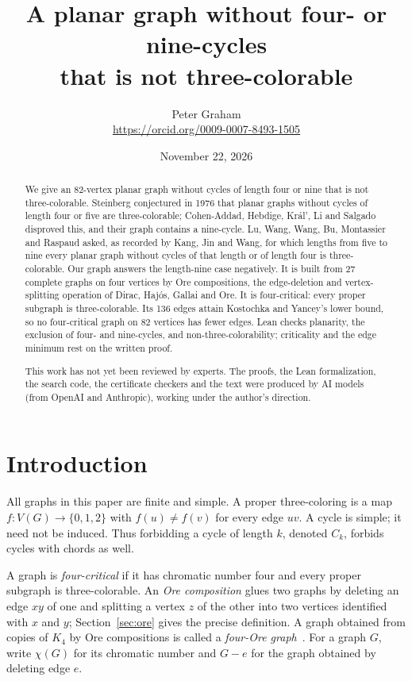 \documentclass[11pt]{article}
\title{A planar graph without four- or nine-cycles\texorpdfstring{\\}{ }that is not three-colorable}
\author{Peter Graham\\ \small\url{https://orcid.org/0009-0007-8493-1505}}
\date{November 22, 2026}
\begin{document}
\maketitle
\begin{abstract}
We give an 82-vertex planar graph without cycles of length four or nine
that is not three-colorable. Steinberg conjectured in 1976 that planar
graphs without cycles of length four or five are three-colorable;
Cohen-Addad, Hebdige, Kr\'al', Li and Salgado disproved this, and their
graph contains a nine-cycle. Lu, Wang, Wang, Bu, Montassier and Raspaud
asked, as recorded by Kang, Jin and Wang, for which lengths from five to
nine every planar graph without cycles of that length or of length four
is three-colorable. Our graph answers the length-nine case negatively.
It is built from 27 complete graphs on four vertices by Ore
compositions, the edge-deletion and vertex-splitting operation of Dirac,
Haj\'os, Gallai and Ore. It is four-critical: every proper subgraph is
three-colorable. Its 136 edges attain Kostochka and Yancey's lower bound,
so no four-critical graph on 82 vertices has fewer edges. Lean checks planarity, the exclusion of four- and
nine-cycles, and non-three-colorability; criticality and the edge
minimum rest on the written proof.

This work has not yet been reviewed by experts. The proofs, the Lean formalization, the search code, the certificate checkers and the text were produced by AI models (from OpenAI and Anthropic), working under the author's direction.
\end{abstract}
\medskip

\section{Introduction}
All graphs in this paper are finite and simple. A proper three-coloring
is a map $f:V(G)\to\{0,1,2\}$ with $f(u)\ne f(v)$ for every edge $uv$.
A cycle is simple; it need not be induced. Thus forbidding a cycle of
length $k$, denoted $C_k$, forbids cycles with chords as well.

A graph is \emph{four-critical} if it has chromatic number four and
every proper subgraph is three-colorable.
An \emph{Ore composition} glues two graphs by deleting an edge $xy$ of
one and splitting a vertex $z$ of the other into two vertices identified
with $x$ and $y$; Section~\ref{sec:ore} gives the precise definition. A
graph obtained from copies of $K_4$ by Ore compositions is called a
\emph{four-Ore graph}~\cite[Section 1]{ky}.
For a graph $G$, write $\chi(G)$ for its chromatic number and $G-e$ for
the graph obtained by deleting edge $e$.
\end{document}
